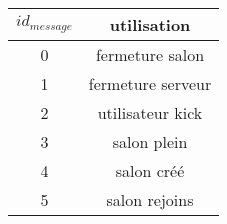 \documentclass[a4paper, 12pt]{article}
\begin{document}
\paragraph{}
\begin{tabular}{|c|c|}
 \hline		
    $id_{message}$ & utilisation \\
 \hline		
    0 & fermeture salon \\
 \hline  
 	1 & fermeture serveur \\
 \hline
 	2 & utilisateur kick \\
 \hline
 	3 & salon plein \\
 \hline
 	4 & salon créé \\
 \hline
 	5 & salon rejoins \\
 \hline
\end{tabular}
\end{document}
